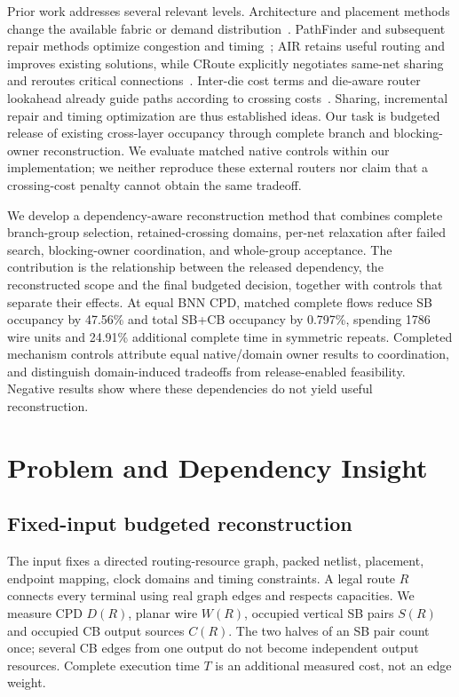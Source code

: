 \documentclass[conference,10pt]{IEEEtran}
\begin{document}
Prior work addresses several relevant levels. Architecture and placement methods change the available fabric or demand distribution~\cite{lazagna,flatland}. PathFinder and subsequent repair methods optimize congestion and timing~\cite{pathfinder,liurepair}; AIR retains useful routing and improves existing solutions, while CRoute explicitly negotiates same-net sharing and reroutes critical connections~\cite{air,croute}. Inter-die cost terms and die-aware router lookahead already guide paths according to crossing costs~\cite{nasiri,multidie}. Sharing, incremental repair and timing optimization are thus established ideas. Our task is budgeted release of existing cross-layer occupancy through complete branch and blocking-owner reconstruction. We evaluate matched native controls within our implementation; we neither reproduce these external routers nor claim that a crossing-cost penalty cannot obtain the same tradeoff.

We develop a dependency-aware reconstruction method that combines complete branch-group selection, retained-crossing domains, per-net relaxation after failed search, blocking-owner coordination, and whole-group acceptance. The contribution is the relationship between the released dependency, the reconstructed scope and the final budgeted decision, together with controls that separate their effects. At equal BNN CPD, matched complete flows reduce SB occupancy by 47.56\% and total SB+CB occupancy by 0.797\%, spending 1786 wire units and 24.91\% additional complete time in symmetric repeats. Completed mechanism controls attribute equal native/domain owner results to coordination, and distinguish domain-induced tradeoffs from release-enabled feasibility. Negative results show where these dependencies do not yield useful reconstruction.

\section{Problem and Dependency Insight}
\subsection{Fixed-input budgeted reconstruction}
The input fixes a directed routing-resource graph, packed netlist, placement, endpoint mapping, clock domains and timing constraints. A legal route $R$ connects every terminal using real graph edges and respects capacities. We measure CPD $D(R)$, planar wire $W(R)$, occupied vertical SB pairs $S(R)$ and occupied CB output sources $C(R)$. The two halves of an SB pair count once; several CB edges from one output do not become independent output resources. Complete execution time $T$ is an additional measured cost, not an edge weight.
\end{document}
